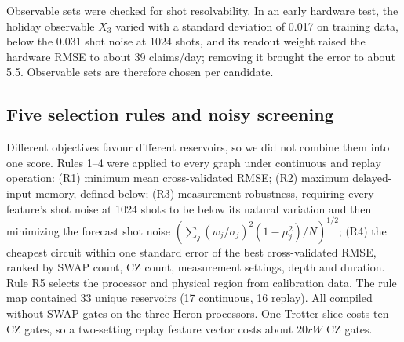 \documentclass[journal]{IEEEtran}
\begin{document}
Observable sets were checked for shot resolvability. In an early hardware test, the holiday observable $X_3$ varied with a standard deviation of 0.017 on training data, below the 0.031 shot noise at 1024 shots, and its readout weight raised the hardware RMSE to about 39 claims/day; removing it brought the error to about 5.5. Observable sets are therefore chosen per candidate.

\subsection{Five selection rules and noisy screening}
Different objectives favour different reservoirs, so we did not combine them into one score. Rules 1--4 were applied to every graph under continuous and replay operation: (R1) minimum mean cross-validated RMSE; (R2) maximum delayed-input memory, defined below; (R3) measurement robustness, requiring every feature's shot noise at 1024 shots to be below its natural variation and then minimizing the forecast shot noise $(\sum_j (w_j/\sigma_j)^2(1-\mu_j^2)/N)^{1/2}$; (R4) the cheapest circuit within one standard error of the best cross-validated RMSE, ranked by SWAP count, CZ count, measurement settings, depth and duration. Rule R5 selects the processor and physical region from calibration data. The rule map contained 33 unique reservoirs (17 continuous, 16 replay). All compiled without SWAP gates on the three Heron processors. One Trotter slice costs ten CZ gates, so a two-setting replay feature vector costs about $20rW$ CZ gates.
\end{document}
